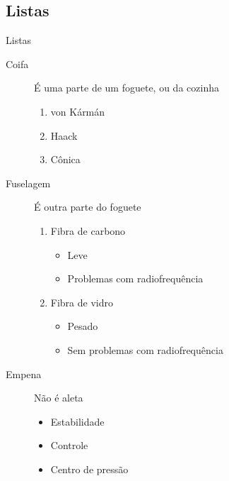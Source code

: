     \subsection{Listas}
    \begin{frame}{Listas}
            \begin{description}
                \item[Coifa] É uma parte de um foguete, ou da cozinha
                \begin{enumerate}
                    \item von Kármán
                    \item Haack
                    \item Cônica
                \end{enumerate}
                \item[Fuselagem] É outra parte do foguete
                \begin{enumerate}
                    \item Fibra de carbono
                    \begin{itemize}
                        \item Leve
                        \item Problemas com radiofrequência
                    \end{itemize}
                    \item Fibra de vidro
                    \begin{itemize}
                        \item Pesado
                        \item Sem problemas com radiofrequência
                    \end{itemize}
                \end{enumerate}
                \item[Empena] Não é aleta
                \begin{itemize}
                    \item Estabilidade
                    \item Controle
                    \item Centro de pressão
                \end{itemize}
            \end{description}
    \end{frame}

